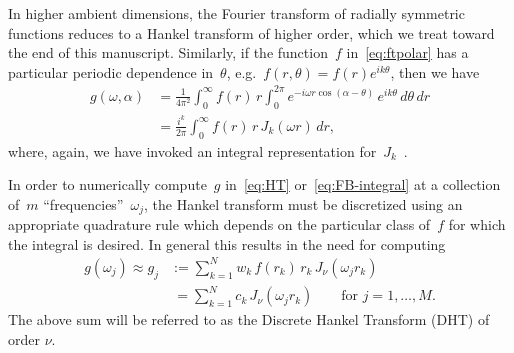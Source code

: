 In higher ambient dimensions, the Fourier transform of radially symmetric
functions reduces to a Hankel transform of higher order, which we treat toward
the end of this manuscript. Similarly, if the function~$f$ in~\eqref{eq:ftpolar}
has a particular periodic dependence in~$\theta$, e.g.~$f(r,\theta) =
f(r)e^{ik\theta}$, then we have
\begin{equation} \label{eq:FB-integral}
  \begin{aligned}
  g(\omega,\alpha) &= \frac{1}{4\pi^2} \int_0^\infty f(r) \, r \int_0^{2\pi} 
  e^{-i \omega r \cos(\alpha - \theta) } \, e^{ik\theta}  \, d\theta \, dr \\
  &= \frac{i^k}{2\pi} \int_0^\infty f(r) \, r \, J_k(\omega r)  \, dr,
  \end{aligned}
\end{equation}
where, again, we have invoked an integral representation
for~$J_k$~\cite{olver2010nist}. 

In order to numerically compute~$g$ in~\eqref{eq:HT} or~\eqref{eq:FB-integral}
at a collection of~$m$ ``frequencies''~$\omega_j$, the Hankel transform must be
discretized using an appropriate quadrature rule which depends on the particular
class of~$f$ for which the integral is desired. In general this results in the
need for computing
\begin{equation} \label{eq:DHT}
  \begin{aligned}
  g(\omega_j) \approx 
  g_j &:= \sum_{k=1}^N w_k \, f(r_k) \, r_k \, J_\nu(\omega_j r_k) \\
  &\ = \sum_{k=1}^N c_k \, J_\nu(\omega_j r_k)
   \qquad \text{for } j = 1, \ldots, M.
  \end{aligned}
\end{equation}
The above sum will be referred to as the Discrete Hankel Transform (DHT) of
order $\nu$. 

